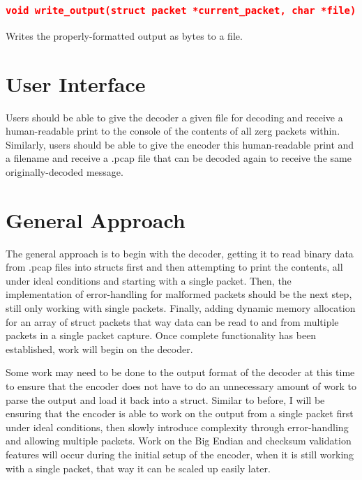 \documentclass[11pt]{report}
\begin{document}
\subsubsection*{\texttt{\textcolor{red}{void write\_output(struct packet *current\_packet, char *file)}}}
Writes the properly-formatted output as bytes to a file.
\pagebreak
\section*{User Interface}
Users should be able to give the decoder a given file for decoding and receive a human-readable print to the console of the contents of all zerg packets within. Similarly, users should be able to give the encoder this human-readable print and a filename and receive a .pcap file that can be decoded again to receive the same originally-decoded message.
\pagebreak
\section*{General Approach}
The general approach is to begin with the decoder, getting it to read binary data from .pcap files into structs first and then attempting to print the contents, all under ideal conditions and starting with a single packet. Then, the implementation of error-handling for malformed packets should be the next step, still only working with single packets. Finally, adding dynamic memory allocation for an array of struct packets that way data can be read to and from multiple packets in a single packet capture. Once complete functionality has been established, work will begin on the decoder.

Some work may need to be done to the output format of the decoder at this time to ensure that the encoder does not have to do an unnecessary amount of work to parse the output and load it back into a struct. Similar to before, I will be ensuring that the encoder is able to work on the output from a single packet first under ideal conditions, then slowly introduce complexity through error-handling and allowing multiple packets. Work on the Big Endian and checksum validation features will occur during the initial setup of the encoder, when it is still working with a single packet, that way it can be scaled up easily later.
\end{document}
